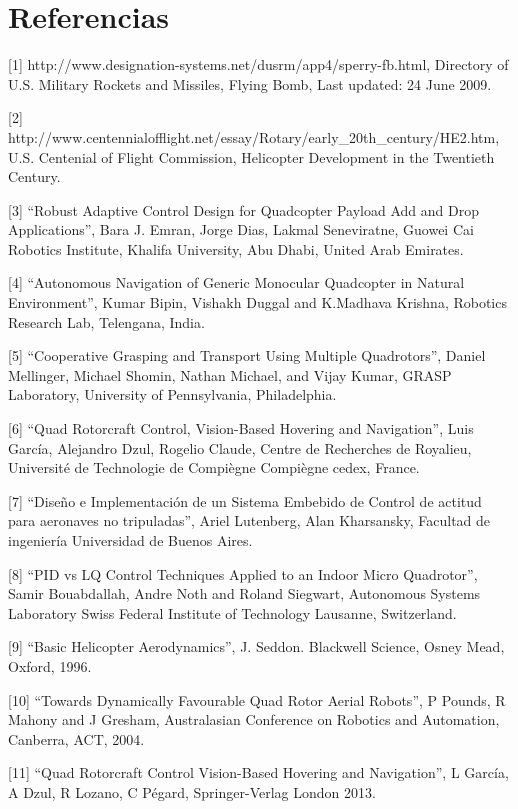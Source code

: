 \documentclass[../main.tex]{subfiles}
\begin{document}
		
	\chapter[Referencias]{Referencias}
	
[1]  http://www.designation-systems.net/dusrm/app4/sperry-fb.html, 
       Directory of U.S. Military Rockets and Missiles, Flying Bomb, Last updated: 24 June 2009.

[2] http://www.centennialofflight.net/essay/Rotary/early\_20th\_century/HE2.htm, 
U.S. Centenial of Flight Commission, Helicopter Development in the Twentieth Century.

[3] ``Robust Adaptive Control Design for Quadcopter Payload Add
and Drop Applications'', Bara J. Emran, Jorge Dias, Lakmal Seneviratne,
Guowei Cai Robotics Institute, Khalifa University, Abu Dhabi, United
Arab Emirates.

[4] ``Autonomous Navigation of Generic Monocular Quadcopter in
Natural Environment'', Kumar Bipin, Vishakh Duggal and K.Madhava
Krishna, Robotics Research Lab, Telengana, India.

[5] ``Cooperative Grasping and Transport Using Multiple Quadrotors'',
Daniel Mellinger, Michael Shomin, Nathan Michael, and Vijay Kumar,
GRASP Laboratory, University of Pennsylvania, Philadelphia.

[6] ``Quad Rotorcraft Control, Vision-Based Hovering and Navigation'',
Luis García, Alejandro Dzul, Rogelio Claude, Centre de Recherches
de Royalieu, Université de Technologie de Compiègne Compiègne cedex,
France.

\newpage

[7] ``Diseño e Implementación de un Sistema Embebido de Control
de actitud para aeronaves no tripuladas'', Ariel Lutenberg, Alan
Kharsansky, Facultad de ingeniería Universidad de Buenos Aires.

[8] ``PID vs LQ Control Techniques Applied to an Indoor Micro
Quadrotor'', Samir Bouabdallah, Andre Noth and Roland
Siegwart, Autonomous Systems Laboratory Swiss Federal Institute of
Technology Lausanne, Switzerland.

[9] ``Basic Helicopter Aerodynamics'', J. Seddon. Blackwell Science, Osney Mead, Oxford, 1996.

[10]  ``Towards Dynamically Favourable Quad Rotor Aerial Robots'', P Pounds, R Mahony and J Gresham, 
Australasian Conference on Robotics and Automation, Canberra, ACT, 2004.

[11] ``Quad Rotorcraft Control Vision-Based Hovering and Navigation'', L García, A Dzul, R Lozano, C Pégard, Springer-Verlag
London 2013.
\end{document}
